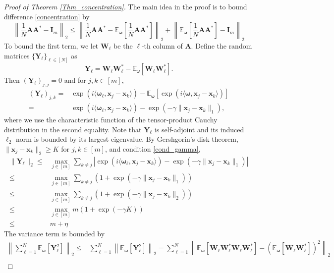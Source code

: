 \documentclass[11pt,twoside]{article}
\theoremstyle{plain}
\theoremstyle{definition}
\theoremstyle{remark}
\newcommand{\E}{\mathbb{E}}
\newcommand{\Ab}{\mathbf{A}}
\newcommand{\Ib}{\mathbf{I}}
\newcommand{\Yb}{\mathbf{Y}}
\newcommand{\Wb}{\mathbf{W}}
\newcommand{\xb}{\mathbf{x}}
\newcommand{\omegab}{\boldsymbol\omega}
\begin{document}
\begin{proof}[Proof of Theorem \ref{Thm_concentration}]
The main idea in the proof is to bound difference \eqref{concentration} by 
$$
\left\|\frac{1}{N}\Ab\Ab^* - \Ib_m\right\|_2 \leq \left\| \frac{1}{N}\Ab\Ab^* - \E_{\omegab} \left[ \frac{1}{N}\Ab\Ab^* \right] \right\|_2 + \left\| \E_{\omegab} \left[ \frac{1}{N}\Ab\Ab^* \right] - \Ib_m \right\|_2
$$
To bound the first term, we let $\Wb_\ell$ be the $\ell$-th column of $\Ab$. Define the random matrices $\{ \Yb_\ell\}_{\ell\in[N]}$ as 
\begin{equation}
\Yb_\ell = \Wb_\ell \Wb_\ell^* - \E_\omega[\Wb_\ell \Wb_\ell^*].
\end{equation}
Then $(\Yb_\ell)_{j,j} = 0$ and for $j,k\in[m]$,  
\begin{equation*}
\begin{aligned}
(\Yb_\ell)_{j,k} =& \exp(i\langle \omegab_\ell, \xb_j-\xb_k\rangle) - \E_{\omegab} [\exp(i\langle \omegab, \xb_j-\xb_k\rangle)] \\
=& \exp(i\langle \omegab_\ell, \xb_j-\xb_k\rangle) - \exp(-\gamma\|\xb_j-\xb_k\|_1),
\end{aligned}
\end{equation*}
where we use the characteristic function of the tensor-product Cauchy distribution in the second equality.
Note that $\Yb_\ell$ is self-adjoint and its induced $\ell_2$ norm is bounded by its largest eigenvalue.
By Gershgorin’s disk theorem, $\|\xb_j-\xb_k\|_2\geq K$ for $j,k\in[m]$, and condition \eqref{cond_gamma},
\begin{equation}
\begin{aligned}
\|\Yb_\ell\|_2 \leq& \max_{j\in[m]} \sum_{k\neq j} |\exp(i\langle \omegab_\ell, \xb_j-\xb_k\rangle) - \exp(-\gamma\|\xb_j-\xb_k\|_1)| \\
\leq& \max_{j\in[m]} \sum_{k\neq j} \left( 1+\exp(-\gamma\|\xb_j-\xb_k\|_1) \right) \\
\leq& \max_{j\in[m]} \sum_{k\neq j} \left( 1+\exp(-\gamma\|\xb_j-\xb_k\|_2) \right) \\
\leq& \max_{j\in[m]} m(1+\exp(-\gamma K)) \\
\leq& m+\eta
\end{aligned} 
\end{equation}
The variance term is bounded by
\begin{equation}
\begin{aligned}
\left\|\sum_{\ell=1}^N \E_{\omegab} [\Yb_\ell^2] \right\|_2 \leq& \sum_{\ell=1}^N \left\|\E_{\omegab} [\Yb_\ell^2]\right\|_2 = \sum_{\ell=1}^N \left\|\E_{\omegab} \left[\Wb_\ell \Wb_\ell^* \Wb_\ell \Wb_\ell^*\right] - \left( \E_{\omegab} \left[\Wb_\ell \Wb_\ell^*\right]\right)^2\right\|_2\\

\end{aligned}
\end{equation}
\end{proof}
\end{document}
